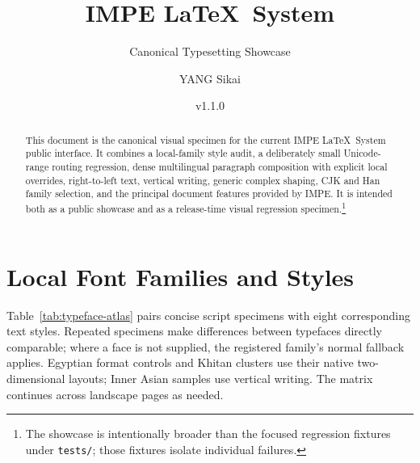 \documentclass[11pt,twoside]{impeart}
\title{IMPE \LaTeX~System}
\subtitle{Canonical Typesetting Showcase}
\author{YANG Sikai}
\date{v1.1.0}
\begin{document}
\maketitle

\begin{abstract}
This document is the canonical visual specimen for the current IMPE \LaTeX~System public interface. It combines a local-family style audit, a deliberately
small Unicode-range routing regression, dense multilingual paragraph
composition with explicit local overrides, right-to-left text, vertical
writing, generic complex shaping, CJK and Han family selection, and the
principal document features provided by IMPE. It is intended both as a public
showcase and as a release-time visual regression specimen.\footnote{The
showcase is intentionally broader than the focused regression fixtures under
\texttt{tests/}; those fixtures isolate individual failures.}
\end{abstract}

\tableofcontents



\section{Local Font Families and Styles}

Table~\ref{tab:typeface-atlas} pairs concise script specimens with eight
corresponding text styles. Repeated specimens make differences between
typefaces directly comparable; where a face is not supplied, the registered
family's normal fallback applies. Egyptian format controls and Khitan clusters
use their native two-dimensional layouts; Inner Asian samples use vertical
writing. The matrix continues across landscape pages as needed.
\end{document}

